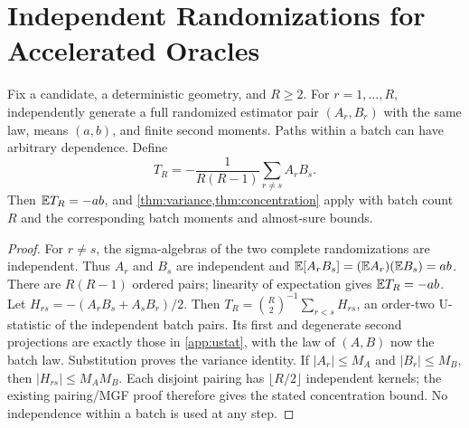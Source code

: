 \section{Independent Randomizations for Accelerated Oracles}
\label{app:batchindependence}

\begin{proposition}
Fix a candidate, a deterministic geometry, and $R\ge2$. For $r=1,\ldots,R$, independently
generate a full randomized estimator pair $(A_r,B_r)$ with the same law,
means $(a,b)$, and finite second moments.  Paths within a batch can have
arbitrary dependence.  Define
\begin{equation}
 T_R=-\frac{1}{R(R-1)}\sum_{r\ne s}A_rB_s.
\end{equation}
Then $\mathbb{E} T_R=-ab$, and \cref{thm:variance,thm:concentration} apply with batch
count $R$ and the corresponding batch moments and almost-sure bounds.
\end{proposition}
\begin{proof}
For $r\ne s$, the sigma-algebras of the two complete randomizations are
independent.  Thus $A_r$ and $B_s$ are independent and
$\mathbb{E}[A_rB_s]=(\mathbb{E} A_r)(\mathbb{E} B_s)=ab$.  There are $R(R-1)$ ordered pairs;
linearity of expectation gives $\mathbb{E} T_R=-ab$.  Let
$H_{rs}=-(A_rB_s+A_sB_r)/2$.  Then
$T_R=\binom R2^{-1}\sum_{r<s}H_{rs}$, an order-two U-statistic of the
independent batch pairs.  Its first and degenerate second projections are
exactly those in \cref{app:ustat}, with the law of $(A,B)$ now the batch law.
Substitution proves the variance identity.  If $|A_r|\le M_A$ and
$|B_r|\le M_B$, then $|H_{rs}|\le M_AM_B$.  Each disjoint pairing has
$\lfloor R/2\rfloor$ independent kernels; the existing pairing/MGF proof
therefore gives the stated concentration bound.  No independence within a
batch is used at any step.
\end{proof}


